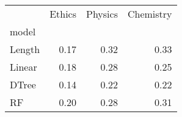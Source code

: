 \begin{tabular}{lrrr}
\toprule
{} &  Ethics &  Physics &  Chemistry \\
model  &         &          &            \\
\midrule
Length &    0.17 &     0.32 &       0.33 \\
Linear &    0.18 &     0.28 &       0.25 \\
DTree  &    0.14 &     0.22 &       0.22 \\
RF     &    0.20 &     0.28 &       0.31 \\
\bottomrule
\end{tabular}
